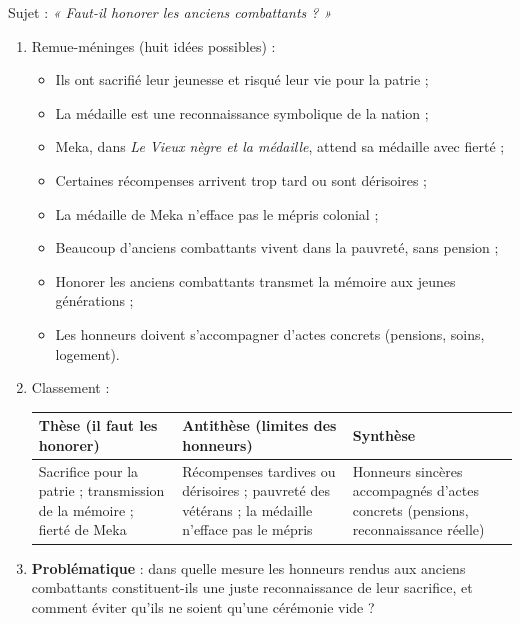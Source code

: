 \documentclass[11pt]{article}
\begin{document}
\begin{corrige}
Sujet : \emph{« Faut-il honorer les anciens combattants ? »}
\begin{enumerate}
\item Remue-méninges (huit idées possibles) :
\begin{itemize}
\item Ils ont sacrifié leur jeunesse et risqué leur vie pour la patrie ;
\item La médaille est une reconnaissance symbolique de la nation ;
\item Meka, dans \emph{Le Vieux nègre et la médaille}, attend sa médaille avec fierté ;
\item Certaines récompenses arrivent trop tard ou sont dérisoires ;
\item La médaille de Meka n'efface pas le mépris colonial ;
\item Beaucoup d'anciens combattants vivent dans la pauvreté, sans pension ;
\item Honorer les anciens combattants transmet la mémoire aux jeunes générations ;
\item Les honneurs doivent s'accompagner d'actes concrets (pensions, soins, logement).
\end{itemize}
\item Classement :
\begin{center}
\begin{tabularx}{\linewidth}{|X|X|X|}
\hline
\rowcolor{popblueL} \textbf{Thèse (il faut les honorer)} & \textbf{Antithèse (limites des honneurs)} & \textbf{Synthèse} \\
\hline
Sacrifice pour la patrie ; transmission de la mémoire ; fierté de Meka & Récompenses tardives ou dérisoires ; pauvreté des vétérans ; la médaille n'efface pas le mépris & Honneurs sincères accompagnés d'actes concrets (pensions, reconnaissance réelle) \\
\hline
\end{tabularx}
\end{center}
\item \textbf{Problématique} : dans quelle mesure les honneurs rendus aux anciens combattants constituent-ils une juste reconnaissance de leur sacrifice, et comment éviter qu'ils ne soient qu'une cérémonie vide ?
\end{enumerate}
\end{corrige}
\end{document}
